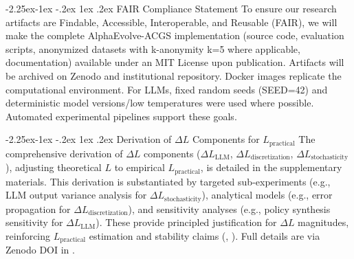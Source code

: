 \documentclass[manuscript,screen,9pt]{acmart}
\makeatletter
\renewcommand\subsection{\@startsection{subsection}{2}{\z@}%
  {-2.25ex\@plus -1ex \@minus -.2ex}%
  {1ex \@plus .2ex}%
  {\normalfont\large\bfseries}}
\makeatother
\begin{document}
\begin{table}[!htb]
\subsection{FAIR Compliance Statement}
\label{app:fair_compliance}
To ensure our research artifacts are Findable, Accessible, Interoperable, and Reusable (FAIR), we will make the complete AlphaEvolve-ACGS implementation (source code, evaluation scripts, anonymized datasets with k-anonymity k=5 where applicable, documentation) available under an MIT License upon publication. Artifacts will be archived on Zenodo and institutional repository. Docker images replicate the computational environment. For LLMs, fixed random seeds (SEED=42) and deterministic model versions/low temperatures were used where possible. Automated experimental pipelines support these goals.

\subsection{Derivation of \texorpdfstring{$\Delta L$}{Delta L} Components for \texorpdfstring{$L_{\text{practical}}$}{L\_practical}}
\label{app:delta_L_derivation}
The comprehensive derivation of $\Delta L$ components ($\Delta L_{\text{LLM}}$, $\Delta L_{\text{discretization}}$, $\Delta L_{\text{stochasticity}}$), adjusting theoretical $L$ to empirical $L_{\text{practical}}$, is detailed in the supplementary materials. This derivation is substantiated by targeted sub-experiments (e.g., LLM output variance analysis for $\Delta L_{\text{stochasticity}}$), analytical models (e.g., error propagation for $\Delta L_{\text{discretization}}$), and sensitivity analyses (e.g., policy synthesis sensitivity for $\Delta L_{\text{LLM}}$). These provide principled justification for $\Delta L$ magnitudes, reinforcing $L_{\text{practical}}$ estimation and stability claims (, ). Full details are via Zenodo DOI in .


\end{table}
\end{document}
